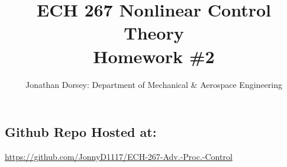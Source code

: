 \documentclass[12px]{article}
\begin{document}
    \title{ECH 267 Nonlinear Control Theory \\ Homework \#2  }

    \author{Jonathan Dorsey: Department of Mechanical \& Aerospace Engineering}


    \maketitle


    \begin{center}
        \section*{Github Repo Hosted at: }
        \url{https://github.com/JonnyD1117/ECH-267-Adv.-Proc.-Control}
    \end{center}



























\end{document}
